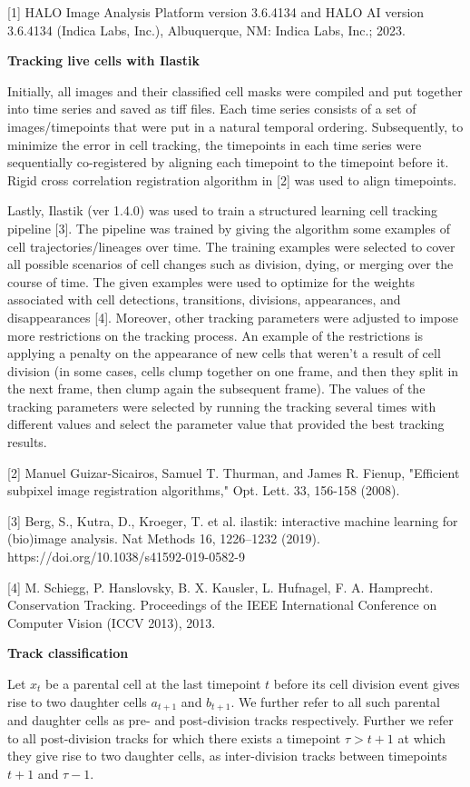 \documentclass[11pt,notitlepage]{article}
\begin{document}
[1] HALO Image Analysis Platform version 3.6.4134 and HALO AI version 3.6.4134 (Indica Labs, Inc.), Albuquerque, NM: Indica Labs, Inc.; 2023.

\textbf{Tracking live cells with Ilastik}

Initially, all images and their classified cell masks were compiled and put together into time series and saved as tiff files. Each time series consists of a set of images/timepoints that were put in a natural temporal ordering. Subsequently, to minimize the error in cell tracking, the timepoints in each time series were sequentially co-registered by aligning each timepoint to the timepoint before it. Rigid cross correlation registration algorithm in [2] was used to align timepoints.

Lastly, Ilastik (ver 1.4.0) was used to train a structured learning cell tracking pipeline [3]. The pipeline was trained by giving the algorithm some examples of cell trajectories/lineages over time. The training examples were selected to cover all possible scenarios of cell changes such as division, dying, or merging over the course of time. The given examples were used to optimize for the weights associated with cell detections, transitions, divisions, appearances, and disappearances [4].  Moreover, other tracking parameters were adjusted to impose more restrictions on the tracking process. An example of the restrictions is applying a penalty on the appearance of new cells that weren’t a result of cell division (in some cases, cells clump together on one frame, and then they split in the next frame, then clump again the subsequent frame).  The values of the tracking parameters were selected by running the tracking several times with different values and select the parameter value that provided the best tracking results.

[2] Manuel Guizar-Sicairos, Samuel T. Thurman, and James R. Fienup, "Efficient subpixel image registration algorithms," Opt. Lett. 33, 156-158 (2008).

[3] Berg, S., Kutra, D., Kroeger, T. et al. ilastik: interactive machine learning for (bio)image analysis. Nat Methods 16, 1226–1232 (2019). https://doi.org/10.1038/s41592-019-0582-9

[4] M. Schiegg, P. Hanslovsky, B. X. Kausler, L. Hufnagel, F. A. Hamprecht. Conservation Tracking. Proceedings of the IEEE International Conference on Computer Vision (ICCV 2013), 2013.

\textbf{Track classification}

Let $x_t$ be a parental cell at the last timepoint $t$ before its cell division event gives rise to two daughter cells $a_{t+1}$ and $b_{t+1}$. We further refer to all such parental and daughter cells as pre- and post-division tracks respectively. Further we refer to all post-division tracks for which there exists a timepoint $\tau > t+1$ at which they give rise to two daughter cells, as inter-division tracks between timepoints $t+1$ and $\tau - 1$.
\end{document}
